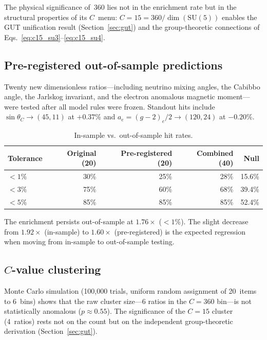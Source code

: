 \documentclass[12pt,a4paper]{article}
\begin{document}
The physical significance of~360 lies not in the enrichment rate but in the
structural properties of its $C$~menu: $C = 15 = 360/\dim(\mathrm{SU}(5))$
enables the GUT unification result (Section~\ref{sec:gut}) and the
group-theoretic connections of Eqs.~\eqref{eq:c15_su3}--\eqref{eq:c15_su4}.

\subsection{Pre-registered out-of-sample predictions}
\label{sec:oos}

Twenty new dimensionless ratios---including neutrino mixing angles, the
Cabibbo angle, the Jarlskog invariant, and the electron anomalous magnetic
moment---were tested after all model rules were frozen.  Standout hits include
$\sin\theta_C \to (45, 11)$ at $+0.37\%$ and
$a_e = (g{-}2)_e/2 \to (120, 24)$ at $-0.20\%$.

\begin{table}[H]
\centering
\caption{In-sample vs.\ out-of-sample hit rates.}
\label{tab:oos}
\begin{tabular}{@{}lrrrr@{}}
\toprule
Tolerance & Original (20) & Pre-registered (20) & Combined (40) & Null \\
\midrule
$< 1\%$ & 30\% & 25\% & 28\% & 15.6\% \\
$< 3\%$ & 75\% & 60\% & 68\% & 39.4\% \\
$< 5\%$ & 85\% & 85\% & 85\% & 52.4\% \\
\bottomrule
\end{tabular}
\end{table}

The enrichment persists out-of-sample at $1.76\times$ ($<\!1\%$).  The slight
decrease from $1.92\times$ (in-sample) to $1.60\times$ (pre-registered) is
the expected regression when moving from in-sample to out-of-sample testing.

\subsection{$C$-value clustering}
\label{sec:clustering}

Monte Carlo simulation (100{,}000 trials, uniform random assignment of
20~items to 6~bins) shows that the raw cluster size---6 ratios in the $C=360$
bin---is not statistically anomalous ($p \approx 0.55$).  The significance of
the $C = 15$ cluster (4~ratios) rests not on the count but on the independent
group-theoretic derivation (Section~\ref{sec:gut}).
\end{document}
